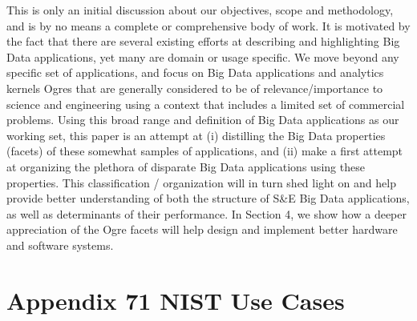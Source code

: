 \documentclass{acm_proc_article-sp}
\begin{document}
This is only an initial discussion about our objectives, scope and methodology, and is by no means a complete or comprehensive body of work. It is motivated by the fact that there are several existing efforts at describing and highlighting Big Data applications, yet many are domain or usage specific. We move beyond any specific set of applications, and focus on Big Data applications and analytics kernels Ogres that are generally considered to be of relevance/importance to science and engineering using a context that includes a limited set of commercial problems. Using this broad range and definition of Big Data applications as our working set, this paper is an attempt at (i) distilling the Big Data properties (facets) of these somewhat samples of applications, and (ii) make a first attempt at organizing the plethora of disparate Big Data applications using these properties. This classification / organization will in turn shed light on and help provide better understanding of both the structure of S\&E Big Data applications, as well as determinants of their performance. In Section 4, we show how a deeper appreciation of the Ogre facets will help design and implement better hardware and software systems.







%

%
%
\appendix
\section{Appendix 71 NIST Use Cases}
\end{document}
